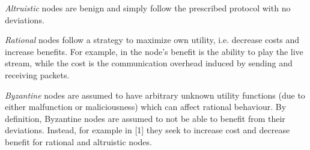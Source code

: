 \documentclass[10pt]{proc}
\begin{document}
\emph{Altruistic} nodes are benign and simply follow the prescribed protocol with no deviations.

\emph{Rational} nodes follow a strategy to maximize own utility, i.e. decrease costs and increase benefits. 
For example, in \cite{li2006bar} the node's benefit is the ability to play the live stream, while the cost is the communication overhead induced by sending and receiving packets. 

\emph{Byzantine} nodes are assumed to have arbitrary unknown utility functions (due to either malfunction or maliciousness) which can affect rational behaviour. By definition, Byzantine nodes are assumed to not be able to benefit from their deviations. Instead, for example in [1] they seek to increase cost and decrease benefit for rational and altruistic nodes.










\end{document}
